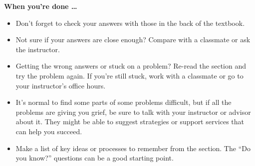 \bigskip

\noindent \textbf{When you're done \ldots}

\begin{itemize}
\item Don't forget to check your answers with those in the back of the textbook. 
\item Not sure if your answers are close enough? Compare with a classmate or ask the instructor.  
\item Getting the wrong answers or stuck on a problem?  Re-read the section and try the problem again.   If you're still stuck, work with a classmate or go to your instructor's office hours.
\item It's normal to find some parts of some problems difficult, but if all the problems are giving you grief, be sure to talk with your instructor or advisor about it.  They might be able to suggest strategies or support services that can help you succeed.
\item Make a list of key ideas or processes to remember from the section.  The ``Do you know?'' questions can be a good starting point.
\end{itemize}



